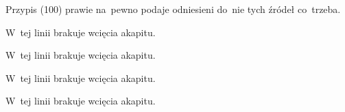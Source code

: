 \documentclass[a4paper,11pt]{article}
\numberwithin{equation}{section}
\begin{document}
\VerSpaceFour





\noindent
{} Przypis (100) prawie na~pewno podaje odniesieni do~nie tych
źródeł co~trzeba.

\VerSpaceFour





\noindent
{} W~tej linii brakuje wcięcia akapitu.

\VerSpaceFour





\noindent
{} W~tej linii brakuje wcięcia akapitu.

\VarSpaceFour





\noindent
{} W~tej linii brakuje wcięcia akapitu.

\VarSpaceFour





\noindent
{} W~tej linii brakuje wcięcia akapitu.

\VerSpaceFour




















\end{document}
